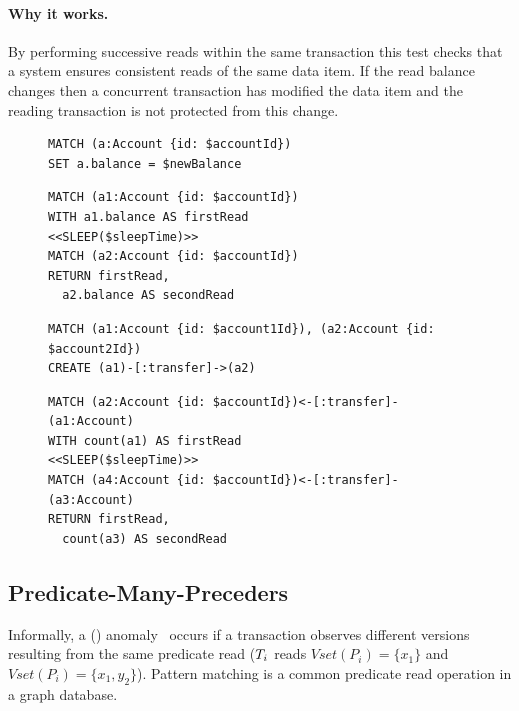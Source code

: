 \paragraph{Why it works.}
By performing successive reads within the same transaction this test checks that
a system ensures consistent reads of the same data item. If the read balance 
changes then a concurrent transaction has modified the data item and the reading
transaction is not protected from this change.

\begin{figure}[htb]
\centering
\begin{minipage}{0.35\linewidth}
\begin{lstlisting}[language=cypher,label=fig:ic1,caption=\tx{IMP $T_\mathrm{W}$}.]
MATCH (a:Account {id: $accountId})
SET a.balance = $newBalance
\end{lstlisting}
\begin{lstlisting}[language=cypher,label=fig:ic2,caption=\tx{IMP $T_\mathrm{R}$}.]
MATCH (a1:Account {id: $accountId})
WITH a1.balance AS firstRead
<<SLEEP($sleepTime)>>
MATCH (a2:Account {id: $accountId})
RETURN firstRead, 
  a2.balance AS secondRead
\end{lstlisting}
\end{minipage}
\quad
\begin{minipage}{0.61\linewidth}
\begin{lstlisting}[language=cypher,label=fig:pc1,caption=\tx{PMP $T_\mathrm{W}$}.]
MATCH (a1:Account {id: $account1Id}), (a2:Account {id: $account2Id})
CREATE (a1)-[:transfer]->(a2)
\end{lstlisting}
\begin{lstlisting}[language=cypher,label=fig:pc2,caption=\tx{PMP $T_\mathrm{R}$}.]
MATCH (a2:Account {id: $accountId})<-[:transfer]-(a1:Account)
WITH count(a1) AS firstRead
<<SLEEP($sleepTime)>>
MATCH (a4:Account {id: $accountId})<-[:transfer]-(a3:Account)
RETURN firstRead, 
  count(a3) AS secondRead
\end{lstlisting}
\end{minipage}
\end{figure}

\subsection*{Predicate-Many-Preceders}

Informally, a  () 
anomaly~\cite{DBLP:journals/pvldb/BailisDFGHS13} occurs if a transaction observes 
different versions resulting from the same predicate read
(\eg $T_i$ reads
$\textit{Vset}(P_i) =  \{x_1\}$ and
$\textit{Vset}(P_i) = \{x_1,y_2\}$).
Pattern matching is a common predicate read operation in a graph database.

